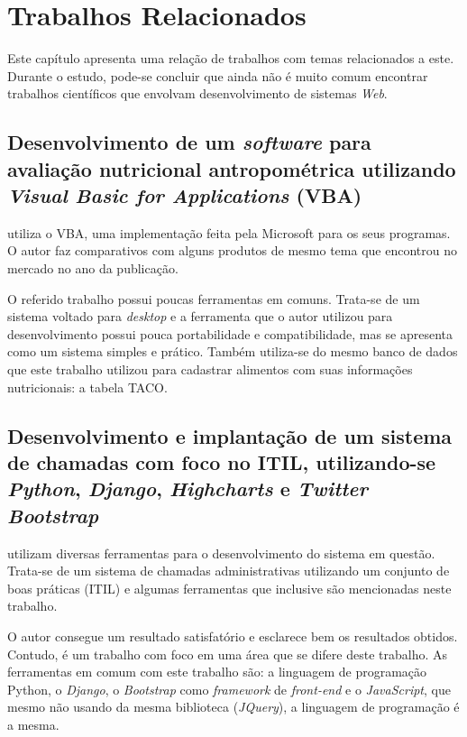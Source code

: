 \documentclass[
	12pt,				%
    oneside,			%
	a4paper,			%
	english,			%
	french,				%
	spanish,			%
	brazil,				%
	]{abntex2}
\begin{document}
\chapter{Trabalhos Relacionados}

Este capítulo apresenta uma relação de trabalhos com temas relacionados a este. Durante o estudo, pode-se concluir que ainda não é muito comum encontrar trabalhos científicos que envolvam desenvolvimento de sistemas \textit{Web}. 

\section{Desenvolvimento de um \textit{software} para avaliação nutricional antropométrica utilizando \textit{Visual Basic for Applications} (VBA)}

utiliza o VBA, uma implementação feita pela Microsoft para os seus programas. O autor faz comparativos com alguns produtos de mesmo tema que encontrou no mercado no ano da publicação.

O referido trabalho possui poucas ferramentas em comuns. Trata-se de um sistema voltado para \textit{desktop} e a ferramenta que o autor utilizou para desenvolvimento possui pouca portabilidade e compatibilidade, mas se apresenta como um sistema simples e prático. Também utiliza-se do mesmo banco de dados que este trabalho utilizou para cadastrar alimentos com suas informações nutricionais: a tabela TACO.


\section{Desenvolvimento e implantação de um sistema de chamadas com foco no ITIL, utilizando-se \textit{Python}, \textit{Django}, \textit{Highcharts} e \textit{Twitter Bootstrap}}

 utilizam diversas ferramentas para o desenvolvimento do sistema em questão. Trata-se de um sistema de chamadas administrativas utilizando um conjunto de boas práticas (ITIL) e algumas ferramentas que inclusive são mencionadas neste trabalho. 

O autor consegue um resultado satisfatório e esclarece bem os resultados obtidos. Contudo, é um trabalho com foco em uma área que se difere deste trabalho. As ferramentas em comum com este trabalho são: a linguagem de programação Python, o \textit{Django}, o \textit{Bootstrap} como \textit{framework} de \textit{front-end} e o \textit{JavaScript}, que mesmo não usando da mesma biblioteca (\textit{JQuery}), a linguagem de programação é a mesma.
\end{document}
